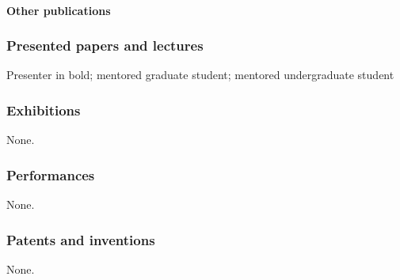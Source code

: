 \nocite{*}
\printbibliography[keyword=OaksPeerReviewed, heading=none]

\paragraph{Other publications}


\subsubsection{Presented papers and lectures}
Presenter in bold; \gradadvisee{}mentored graduate student;
\undergradadvisee{}mentored undergraduate student







\subsubsection{Exhibitions}
None.

\subsubsection{Performances}
None.

\subsubsection{Patents and inventions}
None.

